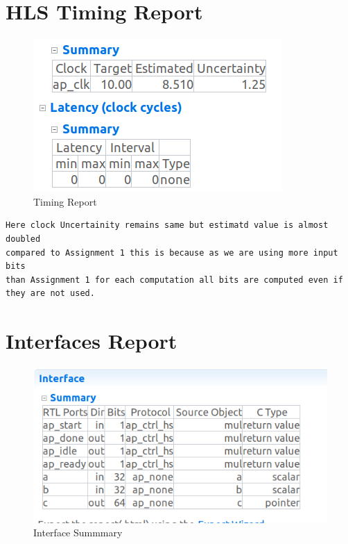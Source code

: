 \documentclass{article}
\begin{document}
\section{HLS Timing Report}
\vspace{1cm}
\begin{figure}[h]
    \centering
\includegraphics[width=\columnwidth]{figs/Timing_Report.png}
    \caption{Timing Report}
    \label{fig:my_label}
\end{figure}

\begin{lstlisting}
Here clock Uncertainity remains same but estimatd value is almost doubled
compared to Assignment 1 this is because as we are using more input bits 
than Assignment 1 for each computation all bits are computed even if 
they are not used.
\end{lstlisting}
\vspace{10cm}


\section{Interfaces Report}
\vspace{1cm}
\begin{figure}[h]
    \centering
\includegraphics[width=\columnwidth]{figs/interfaces.png}
    \caption{Interface Summmary}
    \label{fig:my_label}
\end{figure}
\vspace{5cm}
\end{document}
